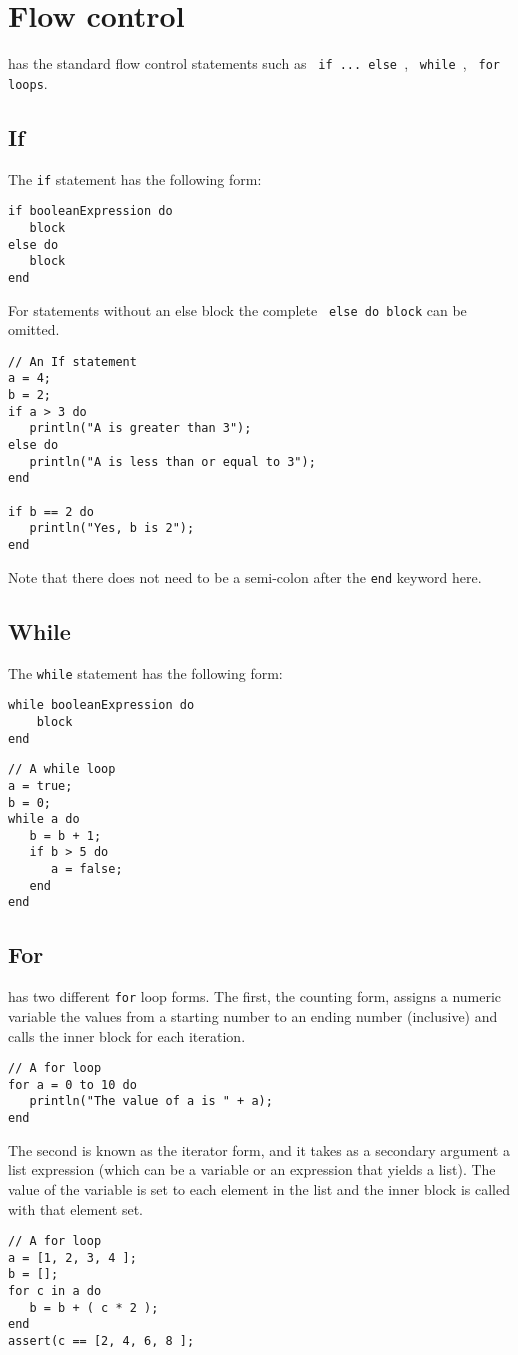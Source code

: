 \chapter{Flow control}
\Reflex has the standard flow control statements such as \Verb+ if ... else +, \verb+ while +, \verb+ for loops+.
\section{If}
The \Reflex \Verb+if+  statement has the following form:
\begin{Verbatim}
if booleanExpression do
   block
else do
   block
end
\end{Verbatim}
For statements without an else  block the complete \Verb+ else do block+ can be omitted.

\begin{lstlisting}[caption={If statement}]
// An If statement
a = 4;
b = 2;
if a > 3 do
   println("A is greater than 3");
else do
   println("A is less than or equal to 3");
end

if b == 2 do
   println("Yes, b is 2");
end
\end{lstlisting}
Note that there does not need to be a semi-colon after the \Verb+end+ keyword here.
\section{While}
The \Reflex \Verb+while+ statement has the following form:
\begin{Verbatim}
while booleanExpression do
    block
end
\end{Verbatim}

\begin{lstlisting}[caption={While statement}]
// A while loop
a = true;
b = 0;
while a do
   b = b + 1;
   if b > 5 do
      a = false;
   end
end
\end{lstlisting}
\section{For}
\Reflex has two different \Verb+for+ loop forms. The first, the counting form, assigns a numeric variable the values from a starting number to an ending number (inclusive) and calls the inner block for each iteration.
\begin{lstlisting}[caption={For counting form}]
// A for loop
for a = 0 to 10 do
   println("The value of a is " + a);
end
\end{lstlisting}
The second is known as the iterator  form, and it takes as a secondary argument a list expression (which can be a variable or an expression that yields a list). The value of the variable is set to each element in the list and the inner block is called with that element set.
\begin{lstlisting}[caption={For iterator form}]
// A for loop
a = [1, 2, 3, 4 ];
b = [];
for c in a do
   b = b + ( c * 2 );
end
assert(c == [2, 4, 6, 8 ];
\end{lstlisting}
